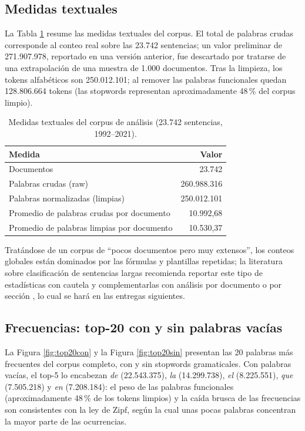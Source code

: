 \documentclass[stu,12pt,spanish,floatsintext,natbib]{apa7}
\begin{document}
\subsection{Medidas textuales}
La Tabla \ref{tab:medidas} resume las medidas textuales del corpus. El
total de palabras crudas corresponde al conteo real sobre las 23.742
sentencias; un valor preliminar de 271.907.978, reportado en una versión
anterior, fue descartado por tratarse de una extrapolación de una muestra
de 1.000 documentos. Tras la limpieza, los tokens alfabéticos son
250.012.101; al remover las palabras funcionales quedan 128.806.664
tokens (las stopwords representan aproximadamente 48\,\% del corpus
limpio).

\begin{table}[htb]
  \caption{Medidas textuales del corpus de análisis (23.742 sentencias,
    1992--2021).}
  \label{tab:medidas}
  \begin{tabular}{lr}
    \toprule
    Medida & Valor \\
    \midrule
    Documentos & 23.742 \\
    Palabras crudas (raw) & 260.988.316 \\
    Palabras normalizadas (limpias) & 250.012.101 \\
    Promedio de palabras crudas por documento & 10.992,68 \\
    Promedio de palabras limpias por documento & 10.530,37 \\
    \bottomrule
  \end{tabular}
\end{table}

Tratándose de un corpus de ``pocos documentos pero muy extensos'', los
conteos globales están dominados por las fórmulas y plantillas repetidas;
la literatura sobre clasificación de sentencias largas recomienda reportar
este tipo de estadísticas con cautela y complementarlas con análisis por
documento o por sección \citep{soh2019legalarea}, lo cual se hará en las
entregas siguientes.

\subsection{Frecuencias: top-20 con y sin palabras vacías}
La Figura \ref{fig:top20con} y la Figura \ref{fig:top20sin} presentan las
20 palabras más frecuentes del corpus completo, con y sin stopwords
gramaticales. Con palabras vacías, el top-5 lo encabezan \emph{de}
(22.543.375), \emph{la} (14.299.738), \emph{el} (8.225.551), \emph{que}
(7.505.218) y \emph{en} (7.208.184): el peso de las palabras funcionales
(aproximadamente 48\,\% de los tokens limpios) y la caída brusca de las
frecuencias son consistentes con la ley de Zipf, según la cual unas pocas
palabras concentran la mayor parte de las ocurrencias.
\end{document}
